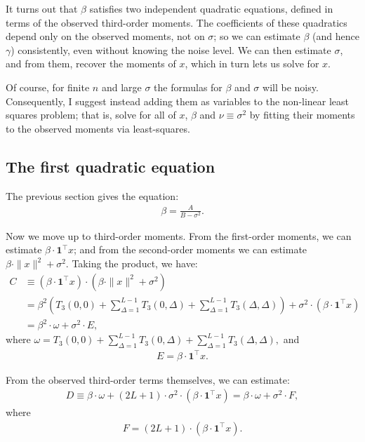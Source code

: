 \documentclass{article}
\theoremstyle{thm}
\theoremstyle{definition}
\newcommand{\1}{\mathbf{1}}
\begin{document}
It turns out that $\beta$ satisfies two independent quadratic equations, defined in terms of the observed third-order moments. The coefficients of these quadratics depend only on the observed moments, not on $\sigma$; so we can estimate $\beta$ (and hence $\gamma$) consistently, even without knowing the noise level. We can then estimate $\sigma$, and from them, recover the moments of $x$, which in turn lets us solve for $x$.

Of course, for finite $n$ and large $\sigma$ the formulas for $\beta$ and $\sigma$ will be noisy. Consequently, I suggest instead adding them as variables to the non-linear least squares problem; that is, solve for all of $x$, $\beta$ and $\nu \equiv \sigma^2$ by fitting their moments to the observed moments via least-squares.

%
%
%
%

\subsection{The first quadratic equation}

The previous section gives the equation:
%
\begin{align}
%
    \beta = \frac{A}{B - \sigma^2}.
%
\end{align}
%

Now we move up to third-order moments. From the first-order moments, we can estimate $\beta \cdot \1^\top x$; and from the second-order moments we can estimate $\beta \cdot \|x\|^2 + \sigma^2$. Taking the product, we have:
%
\begin{align}
%
    C &\equiv (\beta \cdot \1^\top x) \cdot (\beta \cdot \|x\|^2 + \sigma^2)
        \nonumber \\
    &= \beta^2 \left( T_3(0,0) + \sum_{\Delta=1}^{L-1}T_3(0,\Delta) 
        + \sum_{\Delta=1}^{L-1}T_3(\Delta,\Delta) \right)
        + \sigma^2 \cdot (\beta \cdot \1^\top x)
        \nonumber \\
    &= \beta^2 \cdot \omega + \sigma^2 \cdot E,
%
\end{align}
%
where 
%
\begin{math}
%
    \omega = T_3(0,0) + \sum_{\Delta=1}^{L-1}T_3(0,\Delta) 
        + \sum_{\Delta=1}^{L-1}T_3(\Delta,\Delta),
%
\end{math}
%
and
%
\begin{align}
%
    E = \beta \cdot \1^\top x.
%
\end{align}



From the observed third-order terms themselves, we can estimate:
%
\begin{align}
%
    D \equiv \beta\cdot \omega + (2L+1)\cdot\sigma^2\cdot (\beta \cdot \1^\top x)
    = \beta\cdot \omega + \sigma^2\cdot F,
%
\end{align}
%
where
%
\begin{align}
%
    F = (2L+1)\cdot(\beta \cdot \1^\top x).
%
\end{align}
\end{document}
